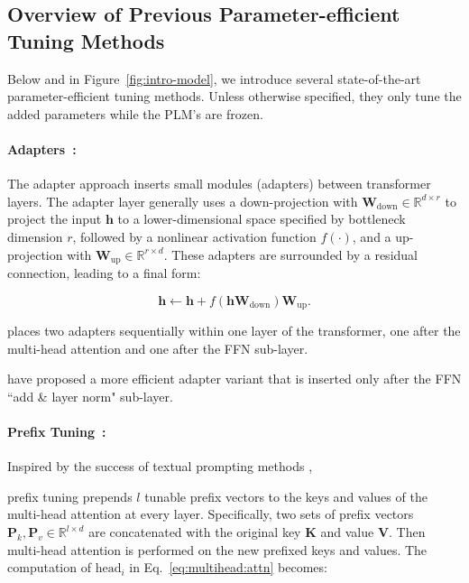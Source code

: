\subsection{Overview of Previous Parameter-efficient Tuning Methods}
\label{sec:overview}
Below and in Figure~\ref{fig:intro-model}, we introduce several state-of-the-art parameter-efficient tuning methods. Unless otherwise specified, they only tune the added parameters while the PLM's are frozen. 
\paragraph{Adapters~\citep{houlsby2019parameter}:} The adapter approach inserts small modules (adapters) between transformer layers. The adapter layer generally uses a down-projection with ${\bm{W}}_{\text{down}} \in{\mathbb{R}}^{d\times r}$ to project the input ${\bm{h}}$ to a lower-dimensional space specified by bottleneck dimension $r$, followed by a nonlinear activation function $f(\cdot)$, and a up-projection with ${\bm{W}}_{\text{up}}\in{\mathbb{R}}^{r\times d}$. These adapters are surrounded by a residual connection, leading to a final form:

\begin{equation}
\label{eq:adapter}
    {\bm{h}} \leftarrow {\bm{h}} + f({\bm{h}}{\bm{W}}_{\text{down}}){\bm{W}}_{\text{up}}.
\end{equation}

\citet{houlsby2019parameter} places two adapters sequentially within one layer of the transformer, one after the multi-head attention and one after the FFN sub-layer.

\citet{pfeiffer2021adapterfusion} have proposed a more efficient adapter variant that is inserted only after the FFN ``add \& layer norm" sub-layer.

\paragraph{Prefix Tuning~\citep{li2021prefix}:}

Inspired by the success of textual prompting methods \citep{liu2021pre}, 

prefix tuning prepends $l$ tunable prefix vectors to the keys and values of the multi-head attention at every layer. Specifically, two sets of prefix vectors ${\bm{P}}_k, {\bm{P}}_v \in {\mathbb{R}}^{l\times d}$ are concatenated with the original key ${\bm{K}}$ and value ${\bm{V}}$. Then multi-head attention is performed on the new prefixed keys and values. The computation of $\mathrm{head}_i$ in Eq.~\ref{eq:multihead:attn} becomes:

